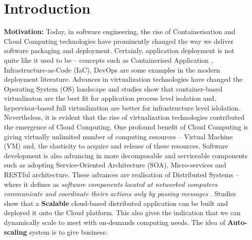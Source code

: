 
\chapter{Introduction} %

\label{Chapter1} %


\newcommand{\keyword}[1]{\textbf{#1}}
\newcommand{\tabhead}[1]{\textbf{#1}}
\newcommand{\code}[1]{\texttt{#1}}
\newcommand{\file}[1]{\texttt{\bfseries#1}}
\newcommand{\option}[1]{\texttt{\itshape#1}}



\textbf{Motivation:} \quad Today, in software engineering, the rise of Containerisation \parencite{Scheepers2014VirtualizationAC} and Cloud Computing \parencite{Armbrust:2010:VCC:1721654.1721672} technologies have prominently changed the way we deliver  software packaging and deployment. Certainly, application deployment is not quite like it used to be -- concepts such as Containerised Application \parencite{Merkel:2014:DLL:2600239.2600241}, Infrastructure-as-Code (IaC), DevOps \parencite{httermann2012devops} are some examples in the modern deployment literature. Advances in virtualization technologies have changed the Operating System (OS) landscape and studies \parencite{Kozhirbayev2017APC} \parencite{5708625} show that container-based virtualizaton are the best fit for application process level isolation and, hypervisor-based full virtualization are better for infrastructure level islolation. Nevertheless, it is evident that the rise of virtualization technologies contributed the emergence of Cloud Computing. One profound benefit of Cloud Computing is giving virtually unlimited number of computing resources -- Virtual Machine (VM) and, the elasticity to acquire and release of these resources. Software development is also advancing in more decomposable and serviceable components such as adopting Service-Oriented Architecture (SOA), Micro-services and RESTful architecture. These advances are realisation of Distributed Systems -- where it defines as \textit{software components located at networked computers communicate and coordinate theirs actions only by passing messages} \parencite{Coulouris:2011:DSC:2029110}. Studies \parencite{Sinnott:2016:SCS:3008079.3008128} show that a \textbf{Scalable} cloud-based distributed application can be built and deployed it onto the Cloud platform. This also gives the indication that we can dynamically scale to meet with on-demands computing needs. The idea of \textbf{Auto-scaling} system is to give business:

